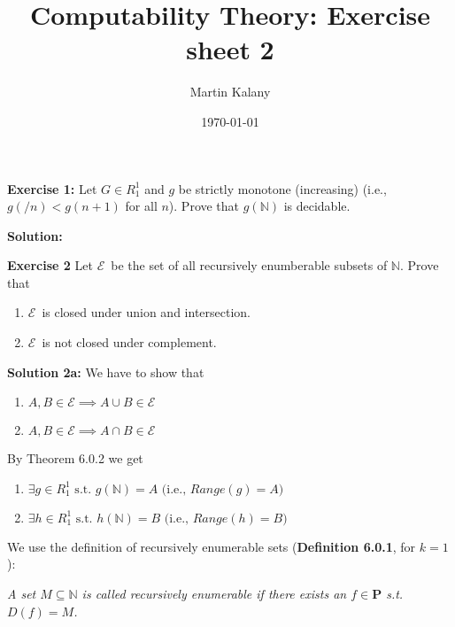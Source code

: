 \documentclass [11pt]{article}
\title{Computability Theory: Exercise sheet 2}
\author{Martin Kalany}
\date{\today}
\newcommand{\E}{\ensuremath{\mathcal{E}}}
\newcommand{\N}{\ensuremath{\mathbb{N}}}
\begin{document}
\maketitle

\bigskip
\noindent
\textbf{Exercise 1:} Let $G \in R^1_1$ and $g$ be strictly monotone (increasing) (i.e., $g(/n) < g(n+1)$ for all $n$). Prove that $g(\N)$ is decidable.

\noindent
\textbf{Solution:}

\bigskip
\noindent
\textbf{Exercise 2}  Let \E\ be the set of all recursively enumberable subsets of \N. Prove that 
\begin{enumerate}[label={\alph*)}] 
 \item \E\ is closed under union and intersection.
 \item \E\ is not closed under complement.
\end{enumerate}
\textbf{Solution 2a:}
We have to show that
\begin{enumerate}[label={\alph*)}] 
 \item $A, B \in \E \implies A\cup B \in \E$ 
 \item $A, B \in \E \implies A\cap B \in \E$ 
\end{enumerate}
By Theorem 6.0.2 we get 
\begin{enumerate}[label={\alph*)}] 
 \item $\exists g \in R_1^1 \text{ s.t.\ } g(\N) = A \text{ (i.e., } Range(g) = A)$
 \item $\exists h \in R_1^1 \text{ s.t.\ } h(\N) = B\text{ (i.e., } Range(h) = B)$
\end{enumerate}
We use the definition of recursively enumerable sets (\textbf{Definition 6.0.1}, for $k=1$):

\noindent
\emph{A set $M \subseteq \N$ is called recursively enumerable if there exists an $f \in \textbf{P}$ s.t.\ $D(f) = M$.}
\end{document}
